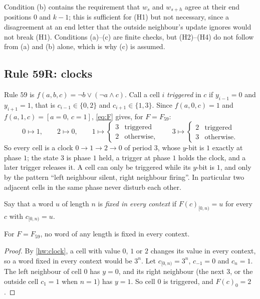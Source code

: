 Condition (b) contains the requirement that $w_s$ and $w_{s+h}$ agree at their end positions $0$ and $k-1$; this is sufficient for (H1) but not necessary, since a disagreement at an end letter that the outside neighbour's update ignores would not break (H1). Conditions (a)--(c) are finite checks, but (H2)--(H4) do not follow from (a) and (b) alone, which is why (c) is assumed.

\subsection{Rule 59R: clocks}\label{hw:sec:59}

Rule $59$ is $f(a,b,c)=\lnot b\lor(\lnot a\land c)$. Call a cell $i$ \emph{triggered} in $c$ if $y_{i-1}=0$ and $y_{i+1}=1$, that is $c_{i-1}\in\{0,2\}$ and $c_{i+1}\in\{1,3\}$. Since $f(a,0,c)=1$ and $f(a,1,c)=[a=0,\,c=1]$, \eqref{eq:F} gives, for $F=F_{59}$:
\begin{equation}\label{hw:clock}
0\mapsto1,\qquad 2\mapsto0,\qquad 1\mapsto\begin{cases}3&\text{triggered}\\2&\text{otherwise,}\end{cases}\qquad 3\mapsto\begin{cases}2&\text{triggered}\\3&\text{otherwise.}\end{cases}
\end{equation}
So every cell is a clock $0\to1\to2\to0$ of period $3$, whose $y$-bit is $1$ exactly at phase $1$; the state $3$ is phase $1$ held, a trigger at phase $1$ holds the clock, and a later trigger releases it. A cell can only be triggered while its $y$-bit is $1$, and only by the pattern ``left neighbour silent, right neighbour firing''. In particular two adjacent cells in the same phase never disturb each other.

Say that a word $u$ of length $n$ is \emph{fixed in every context} if $F(c)_{[0,n)}=u$ for every $c$ with $c_{[0,n)}=u$.

\begin{lemma}\label{hw:nofixed}
For $F=F_{59}$, no word of any length is fixed in every context.
\end{lemma}

\begin{proof}
By \eqref{hw:clock}, a cell with value $0$, $1$ or $2$ changes its value in every context, so a word fixed in every context would be $3^n$. Let $c_{[0,n)}=3^n$, $c_{-1}=0$ and $c_n=1$. The left neighbour of cell $0$ has $y=0$, and its right neighbour (the next $3$, or the outside cell $c_1=1$ when $n=1$) has $y=1$. So cell $0$ is triggered, and $F(c)_0=2$.
\end{proof}

